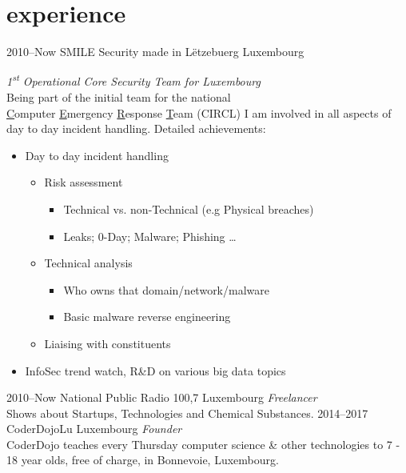 \documentclass[a4paper]{friggeri-cv} %
\begin{document}
\section{experience}
\begin{entrylist}
\entry
{2010--Now}
{SMILE Security made in L\"{e}tzebuerg}
{Luxembourg}
{\emph{1\textsuperscript{st} Operational Core Security Team for Luxembourg} \\
Being part of the initial team for the national \\
\underline{C}omputer \underline{E}mergency \underline{R}esponse \underline{T}eam (CIRCL) I am involved in all aspects of day to day incident handling. Detailed achievements:
\begin{itemize}
    \item Day to day incident handling
    \begin{itemize}
        \item Risk assessment
        \begin{itemize}
        	\item Technical vs. non-Technical (e.g Physical breaches)
            \item Leaks; 0-Day; Malware; Phishing \ldots
        \end{itemize}
        \item Technical analysis
        \begin{itemize}
             \item Who owns that domain/network/malware
             \item Basic malware reverse engineering
        \end{itemize}
        \item Liaising with constituents
    \end{itemize}
    \item InfoSec trend watch, R\&D on various big data topics
\end{itemize}}
\entry
{2010--Now}
{National Public Radio 100,7}
{Luxembourg}
{\emph{Freelancer} \\
Shows about Startups, Technologies and Chemical Substances.}
\entry
{2014--2017}
{CoderDojoLu}
{Luxembourg}
{\emph{Founder} \\
CoderDojo teaches every Thursday computer science \& other technologies to 7 - 18 year olds, free of charge, in Bonnevoie, Luxembourg.}

\end{entrylist}
\end{document}
